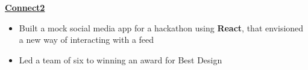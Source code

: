 \textbf{\href{https://github.com/EthanDenny/connect2}{Connect2}} \par
\begin{itemize}
	\item Built a mock social media app for a hackathon using \textbf{React}, that envisioned a new way of interacting with a feed
    \item Led a team of six to winning an award for Best Design
\end{itemize}\vspace{0.1cm} \par

